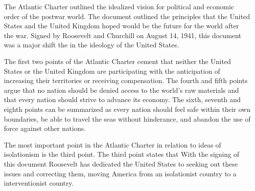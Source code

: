The Atlantic Charter outlined the idealized vision for political and economic order of the postwar world.
The document outlined the principles that the United States and the United Kingdom hoped would be the future for the world after the war.
Signed by Roosevelt and Churchill on August 14, 1941, this document was a major shift the in the ideology of the United States.

The first two points of the Atlantic Charter cement that neither the United States or the United Kingdom are participating with the anticipation of increasing their territories or receiving compensation.
The fourth and fifth points argue that no nation should be denied access to the world's raw materials and that every nation should strive to advance its economy.
The sixth, seventh and eighth points can be summarized as every nation should feel safe within their own boundaries, be able to travel the seas without hinderance, and abandon the use of force against other nations.

The most important point in the Atlantic Charter in relation to ideas of isolationism is the third point.
The third point states that 
With the signing of this document Roosevelt has dedicated the United States to seeking out these issues and correcting them, moving America from an isolationist country to a interventionist country.